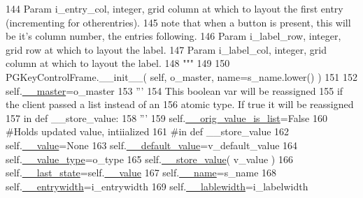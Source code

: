 \begin{DoxyCode}
144 \textcolor{stringliteral}{        Param i\_entry\_col, integer, grid column at which to layout the first entry (incrementing for
       otherentries).}
145 \textcolor{stringliteral}{                note that when a button is present, this will be it's column number, the entries following.
       }
146 \textcolor{stringliteral}{        Param i\_label\_row, integer, grid row at which to layout the label.}
147 \textcolor{stringliteral}{        Param i\_label\_col, integer, grid column at which to layout the label.}
148 \textcolor{stringliteral}{        """}
149 
150         PGKeyControlFrame.\_\_init\_\_( self, o\_master, name=s\_name.lower() )
151 
152         self.\hyperlink{classnegui_1_1pgkeyvalueframe_1_1KeyValFrame_a805253b977c0f43cdcf6ec5de53f14eb}{\_\_master}=o\_master
153         \textcolor{stringliteral}{'''}
154 \textcolor{stringliteral}{        This boolean var will be  reassigned}
155 \textcolor{stringliteral}{        if the client passed a list instead of an}
156 \textcolor{stringliteral}{        atomic type.  If true it will be reassigned}
157 \textcolor{stringliteral}{        in def \_\_store\_value:}
158 \textcolor{stringliteral}{        '''}
159         self.\hyperlink{classnegui_1_1pgkeyvalueframe_1_1KeyValFrame_af0631789b0da26d580e7079d6bcf14f1}{\_\_orig\_value\_is\_list}=\textcolor{keyword}{False}
160         \textcolor{comment}{#Holds updated value, intiialized}
161         \textcolor{comment}{#in def \_\_store\_value}
162         self.\hyperlink{classnegui_1_1pgkeyvalueframe_1_1KeyValFrame_a340fbacda4aba3bab65394922998d5a3}{\_\_value}=\textcolor{keywordtype}{None}
163         self.\hyperlink{classnegui_1_1pgkeyvalueframe_1_1KeyValFrame_ad5f6e2d38d7229b7e0cd23e2ab2fea2b}{\_\_default\_value}=v\_default\_value
164         self.\hyperlink{classnegui_1_1pgkeyvalueframe_1_1KeyValFrame_a5e972b92c19567f763da152f1d4b61dd}{\_\_value\_type}=o\_type
165         self.\hyperlink{classnegui_1_1pgkeyvalueframe_1_1KeyValFrame_a528d362ee685b490efe590679317ca7f}{\_\_store\_value}( v\_value )
166         self.\hyperlink{classnegui_1_1pgkeyvalueframe_1_1KeyValFrame_aecb3998429fcffea6ebb055d5f742963}{\_\_last\_state}=self.\hyperlink{classnegui_1_1pgkeyvalueframe_1_1KeyValFrame_a340fbacda4aba3bab65394922998d5a3}{\_\_value}
167         self.\hyperlink{classnegui_1_1pgkeyvalueframe_1_1KeyValFrame_a68f54607c216bc9ebbe00671b97583bc}{\_\_name}=s\_name
168         self.\hyperlink{classnegui_1_1pgkeyvalueframe_1_1KeyValFrame_a63f2490d3edbc674588303b57ae15aed}{\_\_entrywidth}=i\_entrywidth
169         self.\hyperlink{classnegui_1_1pgkeyvalueframe_1_1KeyValFrame_a98e43c4ade32564297bfbd138c39f6b5}{\_\_lablewidth}=i\_labelwidth

\end{DoxyCode}
